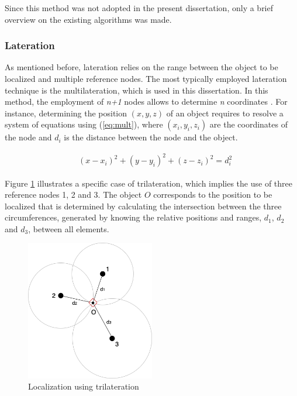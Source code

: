Since this method was not adopted in the present dissertation, only a brief overview on the existing algorithms was made.

\subsubsection{Lateration} \label{subsubsec:lateration}

As mentioned before, lateration relies on the range between the object to be localized and multiple reference nodes. The most typically employed lateration technique is the multilateration, which is used in this dissertation. In this method, the employment of \textit{n+1} nodes allows to determine \textit{n} coordinates \cite{arch_localiz}. For instance, determining the position $(x,y,z)$ of an object requires to resolve a system of equations using (\ref{eq:mult}), where $(x_{i}, y_{i}, z_{i})$ are the coordinates of the node and $d_{i}$ is the distance between the node and the object.

\begin{eqnarray}
	& (x - x_{i})^2 + (y - y_{i})^2 + (z - z_{i})^2 = d_{i}^2 
	\label{eq:mult}
\end{eqnarray}

Figure \ref{fig:trilateration} illustrates a specific case of trilateration, which implies the use of three reference nodes 1, 2 and 3. The object $O$ corresponds to the position to be localized that is determined by calculating the intersection between the three circumferences, generated by knowing the relative positions and ranges, $d_1$, $d_2$ and $d_3$, between all elements.

\begin{figure}[!htbp]
	\centering
	\includegraphics[width=0.5\textwidth]{figures/trilateration}
	\caption{Localization using trilateration}
	\label{fig:trilateration}
\end{figure}


